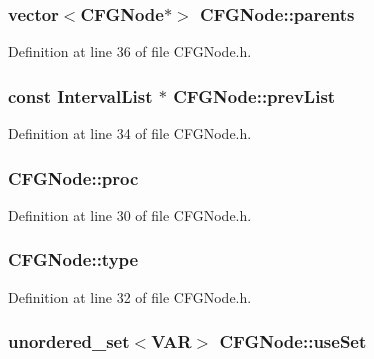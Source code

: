 \hypertarget{class_c_f_g_node_a9c9bf36df87bdf73c6aa507f52efc702}{
\subsubsection[{parents}]{\setlength{\rightskip}{0pt plus 5cm}vector$<${\bf C\-F\-G\-Node}$\ast$$>$ C\-F\-G\-Node\-::parents}}\label{class_c_f_g_node_a9c9bf36df87bdf73c6aa507f52efc702}


Definition at line 36 of file C\-F\-G\-Node.\-h.

\hypertarget{class_c_f_g_node_afd5d0654a254ef7a1c62e47d7ff66f75}{
\subsubsection[{prev\-List}]{\setlength{\rightskip}{0pt plus 5cm}const {\bf Interval\-List} $\ast$ C\-F\-G\-Node\-::prev\-List}}\label{class_c_f_g_node_afd5d0654a254ef7a1c62e47d7ff66f75}


Definition at line 34 of file C\-F\-G\-Node.\-h.

\hypertarget{class_c_f_g_node_a4c29d551dc1b8ac7465ebf4ddd1e3437}{
\subsubsection[{proc}]{ C\-F\-G\-Node\-::proc}}\label{class_c_f_g_node_a4c29d551dc1b8ac7465ebf4ddd1e3437}


Definition at line 30 of file C\-F\-G\-Node.\-h.

\hypertarget{class_c_f_g_node_a71c611eee5b784222a2c51b7a7b6d169}{
\subsubsection[{type}]{ C\-F\-G\-Node\-::type}}\label{class_c_f_g_node_a71c611eee5b784222a2c51b7a7b6d169}


Definition at line 32 of file C\-F\-G\-Node.\-h.

\hypertarget{class_c_f_g_node_aa30a2f657ae1827572d1c6a934a60635}{
\subsubsection[{use\-Set}]{\setlength{\rightskip}{0pt plus 5cm}unordered\-\_\-set$<${\bf V\-A\-R}$>$ C\-F\-G\-Node\-::use\-Set}}\label{class_c_f_g_node_aa30a2f657ae1827572d1c6a934a60635}



